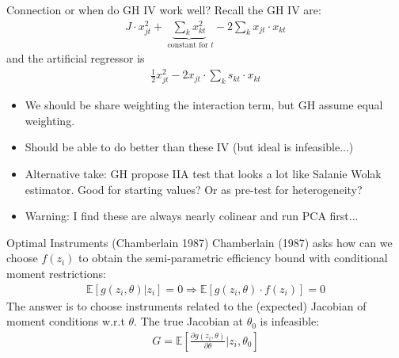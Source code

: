 \documentclass[aspectratio=169,10pt]{beamer}
\begin{document}
\begin{frame}{Connection or when do GH IV work well?}
Recall the GH IV are:
\begin{align*}
J \cdot x_{jt}^2 + \underbrace{\sum_k x_{kt}^2}_{\text{ constant for } t } - 2 \sum_k x_{jt} \cdot x_{kt}
\end{align*}
and the artificial regressor is
\begin{align*}
\frac{1}{2} x_{jt}^2 - 2 x_{jt} \cdot \sum_k s_{kt}  \cdot x_{kt}
\end{align*}
\begin{itemize}
\item We should be \alert{share weighting} the interaction term, but GH assume equal weighting.\\
\item Should be able to do better than these IV (but ideal is infeasible...)
\item Alternative take: GH propose IIA test that looks a lot like Salanie Wolak estimator. Good for starting values? Or as pre-test for heterogeneity?
\item Warning: I find these are always nearly colinear and run PCA first...
\end{itemize}
\end{frame}


\begin{frame}{Optimal Instruments (Chamberlain 1987)}
Chamberlain (1987) asks how can we choose $f(z_i)$ to obtain the semi-parametric efficiency bound with conditional moment restrictions:
\begin{align*}
\mathbb{E}[g(z_i,\theta) | z_i]=0 \Rightarrow \mathbb{E}[g(z_i,\theta) \cdot f(z_i) ]=0
\end{align*}
The answer is to choose instruments related to the (expected) Jacobian of moment conditions w.r.t $\theta$. The true Jacobian at $\theta_0$ is \alert{infeasible}:
\begin{align*}
G=\mathbb{E}\left[\frac{\partial g(z_i,\theta)}{\partial \theta} | z_i, \theta_0 \right]
\end{align*}
\end{frame}
\end{document}
